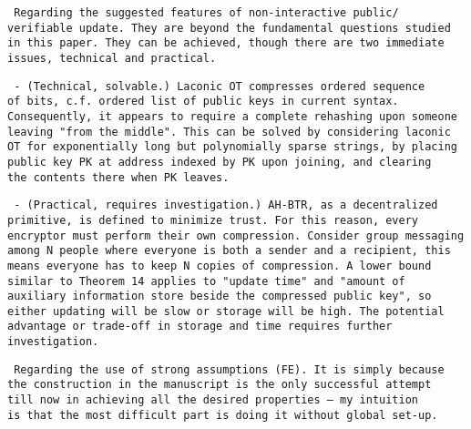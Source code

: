\texttt{
Regarding the suggested features of non-interactive public/\\
verifiable update. They are beyond the fundamental questions studied \\
in this paper. They can be achieved, though there are two immediate \\
issues, technical and practical.
}

\texttt{
- (Technical, solvable.) Laconic OT compresses ordered sequence \\
of bits, c.f. ordered list of public keys in current syntax. \\
Consequently, it appears to require a complete rehashing upon someone \\
leaving "from the middle". This can be solved by considering laconic \\
OT for exponentially long but polynomially sparse strings, by placing \\
public key PK at address indexed by PK upon joining, and clearing \\
the contents there when PK leaves.
}

\texttt{
- (Practical, requires investigation.) AH-BTR, as a decentralized \\
primitive, is defined to minimize trust. For this reason, every \\
encryptor must perform their own compression. Consider group messaging \\
among N people where everyone is both a sender and a recipient, this \\
means everyone has to keep N copies of compression. A lower bound \\
similar to Theorem 14 applies to "update time" and "amount of \\
auxiliary information store beside the compressed public key", so \\
either updating will be slow or storage will be high. The potential \\
advantage or trade-off in storage and time requires further \\
investigation.
}

\texttt{
Regarding the use of strong assumptions (FE). It is simply because \\
the construction in the manuscript is the only successful attempt \\
till now in achieving all the desired properties --- my intuition \\
is that the most difficult part is doing it without global set-up.
}
